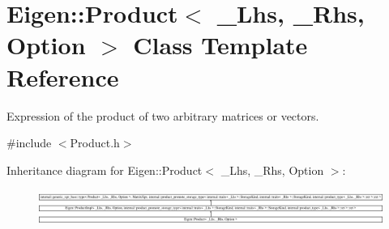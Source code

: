 \hypertarget{class_eigen_1_1_product}{}\section{Eigen\+::Product$<$ \+\_\+\+Lhs, \+\_\+\+Rhs, Option $>$ Class Template Reference}
\label{class_eigen_1_1_product}


Expression of the product of two arbitrary matrices or vectors.  




{\ttfamily \#include $<$Product.\+h$>$}

Inheritance diagram for Eigen\+::Product$<$ \+\_\+\+Lhs, \+\_\+\+Rhs, Option $>$\+:\begin{figure}[H]
\begin{center}
\leavevmode
\includegraphics[height=1.203438cm]{class_eigen_1_1_product}
\end{center}
\end{figure}
